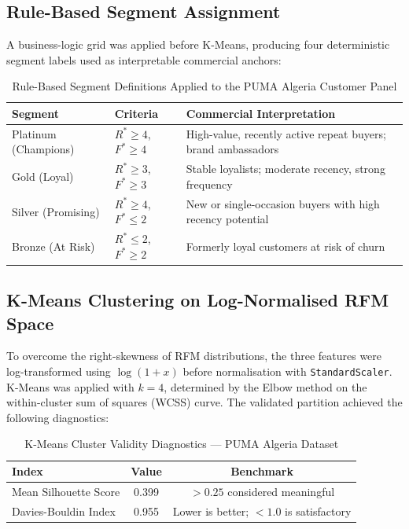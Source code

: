 \subsection{Rule-Based Segment Assignment}

A business-logic grid was applied before K-Means, producing four deterministic segment labels used as interpretable commercial anchors:

\begin{table}[H]
\centering
\caption{Rule-Based Segment Definitions Applied to the PUMA Algeria Customer Panel}
\label{tab:segments}
\begin{tabular}{@{}llp{7cm}@{}}
\toprule
\textbf{Segment} & \textbf{Criteria} & \textbf{Commercial Interpretation} \\
\midrule
Platinum (Champions) & $R^* \geq 4$, $F^* \geq 4$ & High-value, recently active repeat buyers; brand ambassadors \\
Gold (Loyal)         & $R^* \geq 3$, $F^* \geq 3$ & Stable loyalists; moderate recency, strong frequency \\
Silver (Promising)   & $R^* \geq 4$, $F^* \leq 2$ & New or single-occasion buyers with high recency potential \\
Bronze (At Risk)     & $R^* \leq 2$, $F^* \geq 2$ & Formerly loyal customers at risk of churn \\
\bottomrule
\end{tabular}
\end{table}

\subsection{K-Means Clustering on Log-Normalised RFM Space}

To overcome the right-skewness of RFM distributions, the three features were log-transformed using $\log(1 + x)$ before normalisation with \texttt{StandardScaler}. K-Means was applied with $k = 4$, determined by the Elbow method on the within-cluster sum of squares (WCSS) curve. The validated partition achieved the following diagnostics:

\begin{table}[H]
\centering
\caption{K-Means Cluster Validity Diagnostics — PUMA Algeria Dataset}
\label{tab:kmeans_diag}
\begin{tabular}{@{}lcc@{}}
\toprule
\textbf{Index} & \textbf{Value} & \textbf{Benchmark} \\
\midrule
Mean Silhouette Score  & 0.399 & $> 0.25$ considered meaningful \cite{jain1999data} \\
Davies-Bouldin Index   & 0.955 & Lower is better; $< 1.0$ is satisfactory \\
\bottomrule
\end{tabular}
\end{table}


